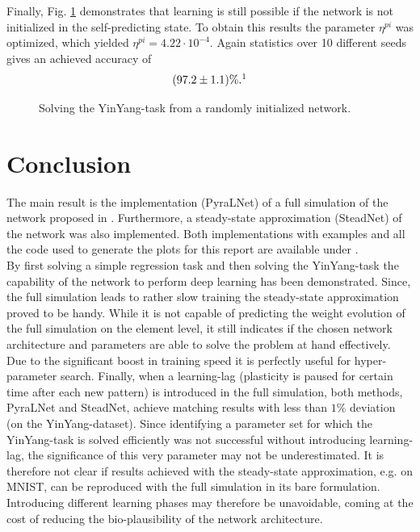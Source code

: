\documentclass[12pt,a4paper]{article}
\begin{document}
Finally, Fig. \ref{fig:yinyang_sps} demonstrates that learning is still possible if the network is not initialized in the self-predicting state. To obtain this results the parameter $\eta^{pi}$ was optimized, which yielded $\eta^{pi} = 4.22\cdot 10^{-4}$. Again statistics over 10 different seeds gives an achieved accuracy of
\begin{equation*}
(97.2 \pm 1.1)\%. \protect\footnotemark
\end{equation*}

\begin{figure}[!ht]
  \centering
  \quad
  \caption{Solving the YinYang-task from a randomly initialized network.}
  \label{fig:yinyang_sps}
\end{figure}

\section{Conclusion}
The main result is the implementation (PyraLNet) of a full simulation of the network proposed in \cite{sac_senn}. Furthermore, a steady-state approximation (SteadNet) of the network was also implemented. Both implementations with examples and all the code used to generate the plots for this report are available under \cite{code}. \\
By first solving a simple regression task and then solving the YinYang-task the capability of the network to perform deep learning has been demonstrated. Since, the full simulation leads to rather slow training the steady-state approximation proved to be handy. While it is not capable of predicting the weight evolution of the full simulation on the element level, it still indicates if the chosen network architecture and parameters are able to solve the problem at hand effectively. Due to the significant boost in training speed it is perfectly useful for hyper-parameter search. Finally, when a learning-lag (plasticity is paused for certain time after each new pattern) is introduced in the full simulation, both methods, PyraLNet and SteadNet, achieve matching results with less than $1$\% deviation (on the YinYang-dataset). Since identifying a parameter set for which the YinYang-task is solved efficiently was not successful without introducing learning-lag, the significance of this very parameter may not be underestimated. It is therefore not clear if results achieved with the steady-state approximation, e.g. on MNIST, can be reproduced with the full simulation in its bare formulation. Introducing different learning phases may therefore be unavoidable, coming at the cost of reducing the bio-plausibility of the network architecture.




\end{document}
